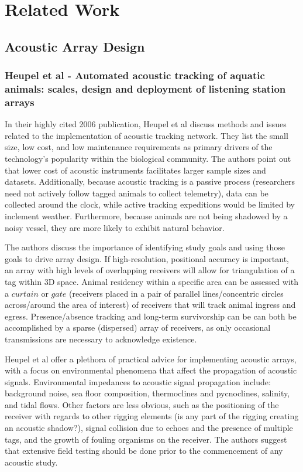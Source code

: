 \chapter{Related Work}

\section{Acoustic Array Design}
\subsection{Heupel et al - Automated acoustic tracking of aquatic animals: scales, design and deployment of listening station arrays}
In their highly cited 2006 publication\cite{Heupel2006}, Heupel et al discuss methods and issues related to the implementation of acoustic tracking network.  They list the small size, low cost, and low maintenance requirements as primary drivers of the technology's popularity within the biological community.  The authors point out that lower cost of acoustic instruments facilitates larger sample sizes and datasets.  Additionally, because acoustic tracking is a passive process (researchers need not actively follow tagged animals to collect telemetry), data can be collected around the clock, while active tracking expeditions would be limited by inclement weather.  Furthermore, because animals are not being shadowed by a noisy vessel, they are more likely to exhibit natural behavior.

The authors discuss the importance of identifying study goals and using those goals to drive array design.  If high-resolution, positional accuracy is important, an array with high levels of overlapping receivers will allow for triangulation of a tag within 3D space.  Animal residency within a specific area can be assessed with a $curtain$ or $gate$ (receivers placed in a pair of parallel lines/concentric circles across/around the area of interest) of receivers that will track animal ingress and egress.  Presence/absence tracking and long-term survivorship can be can both be accomplished by a sparse (dispersed) array of receivers, as only occasional transmissions are necessary to acknowledge existence.

Heupel et al offer a plethora of practical advice for implementing acoustic arrays, with a focus on environmental phenomena that affect the propagation of acoustic signals.  Environmental impedances to acoustic signal propagation include: background noise, sea floor composition, thermoclines and pycnoclines, salinity, and tidal flows.  Other factors are less obvious, such as the positioning of the receiver with regards to other rigging elements (is any part of the rigging creating an acoustic shadow?), signal collision due to echoes and the presence of multiple tags, and the growth of fouling organisms on the receiver.  The authors suggest that extensive field testing should be done prior to the commencement of any acoustic study.


